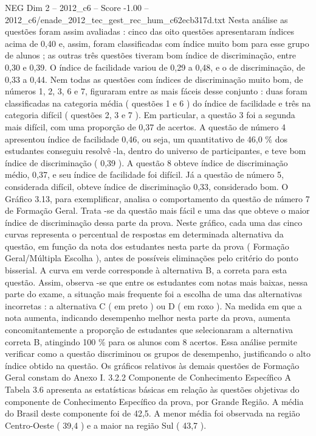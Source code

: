 \begin{textsample}{NEG Dim 2 – 2012\_c6 – Score -1.00 – 2012\_c6/enade\_2012\_tec\_gest\_rec\_hum\_c62ecb317d.txt}
Nesta análise as questões foram assim avaliadas : cinco das oito questões apresentaram índices acima de 0,40 e, assim, foram classificadas com índice muito bom para esse grupo de alunos ; as outras três questões tiveram bom índice de discriminação, entre 0,30 e 0,39.
O índice de facilidade variou de 0,29 a 0,48, e o de discriminação, de 0,33 a 0,44.
Nem todas as questões com índices de discriminação muito bom, de números 1, 2, 3, 6 e 7, figuraram entre as mais fáceis desse conjunto : duas foram classificadas na categoria média ( questões 1 e 6 ) do índice de facilidade e três na categoria difícil ( questões 2, 3 e 7 ).
Em particular, a questão 3 foi a segunda mais difícil, com uma proporção de 0,37 de acertos.
A questão de número 4 apresentou índice de facilidade 0,46, ou seja, um quantitativo de 46,0 \% dos estudantes conseguiu resolvê -la, dentro do universo de participantes, e teve bom índice de discriminação ( 0,39 ).
A questão 8 obteve índice de discriminação médio, 0,37, e seu índice de facilidade foi difícil.
Já a questão de número 5, considerada difícil, obteve índice de discriminação 0,33, considerado bom.
O Gráfico 3.13, para exemplificar, analisa o comportamento da questão de número 7 de Formação Geral.
Trata -se da questão mais fácil e uma das que obteve o maior índice de discriminação dessa parte da prova.
Neste gráfico, cada uma das cinco curvas representa o percentual de respostas em determinada alternativa da questão, em função da nota dos estudantes nesta parte da prova ( Formação Geral/Múltipla Escolha ), antes de possíveis eliminações pelo critério do ponto bisserial.
A curva em verde corresponde à alternativa B, a correta para esta questão.
Assim, observa -se que entre os estudantes com notas mais baixas, nessa parte do exame, a situação mais frequente foi a escolha de uma das alternativas incorretas : a alternativa C ( em preto ) ou D ( em roxo ).
Na medida em que a nota aumenta, indicando desempenho melhor nesta parte da prova, aumenta concomitantemente a proporção de estudantes que selecionaram a alternativa correta B, atingindo 100 \% para os alunos com 8 acertos.
Essa análise permite verificar como a questão discriminou os grupos de desempenho, justificando o alto índice obtido na questão.
Os gráficos relativos às demais questões de Formação Geral constam do Anexo I. 3.2.2 Componente de Conhecimento Específico A Tabela 3.6 apresenta as estatísticas básicas em relação às questões objetivas do componente de Conhecimento Específico da prova, por Grande Região.
A média do Brasil deste componente foi de 42,5.
A menor média foi observada na região Centro-Oeste ( 39,4 ) e a maior na região Sul ( 43,7 ).

\end{textsample}
